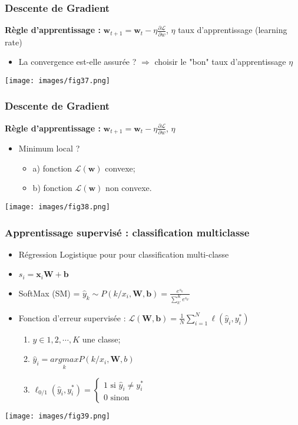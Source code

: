 \documentclass[9pt]{beamer}
\newcommand \ve[1]{\mathbf{#1}}
\begin{document}
\begin{frame}
\frametitle{Descente de Gradient}
\textbf{Règle d'apprentissage : } $\ve{w}_{t+1}=\ve{w}_t-\eta \frac{\partial \mathcal{L}}{\partial w}$, $\eta$ taux d'apprentissage (learning rate)
\begin{itemize}
\item La convergence est-elle assurée ? $\Rightarrow$ choisir le "bon" taux d'apprentissage $\eta$
\end{itemize}

\begin{center}
\texttt{[image: images/fig37.png]}
\end{center}
\end{frame}

\begin{frame}
\frametitle{Descente de Gradient}
\textbf{Règle d'apprentissage : } $\ve{w}_{t+1}=\ve{w}_t-\eta \frac{\partial \mathcal{L}}{\partial w}$, $\eta$ 
\begin{itemize}
\item Minimum local ?
\begin{itemize}
\item a) fonction $\mathcal{L}(\ve{w})$ convexe;
\item b) fonction $\mathcal{L}(\ve{w})$ non convexe.
\end{itemize}
\end{itemize}

\begin{center}
\texttt{[image: images/fig38.png]}
\end{center}
\end{frame}

\begin{frame}
\frametitle{Apprentissage supervisé : classification multiclasse}
\begin{itemize}
\item Régression Logistique pour pour classification multi-classe
\item $s_i=\ve{x}_i\ve{W}+\ve{b}$
\item SoftMax (SM) = $\hat{y}_k \sim P\left( k/x_i,\ve{W}, \ve{b}\right) = \frac{e^{s_k}}{\sum_{k'}^Ke^{s_{k'}}}$
\item Fonction d'erreur supervisée : $\mathcal{L}(\ve{W},\ve{b})=\frac{1}{N}\sum_{i=1}^N \ell (\hat{y}_i,y_i^*)$
\begin{enumerate}
\item $y \in {1, 2, \cdots, K}$ une classe;
\item $\hat{y}_i =\underset{k}{argmax} P(k/x_i,\ve{W},{b})$
\item $\ell_{0/1}(\hat{y}_i, y_i^*) = \begin{cases}
1 \text{ si } \hat{y}_i\neq y_i^* \\
0 \text{ sinon}
\end{cases}$
\end{enumerate}
\end{itemize}
\begin{center}
\texttt{[image: images/fig39.png]}
\end{center}
\end{frame}
\end{document}
